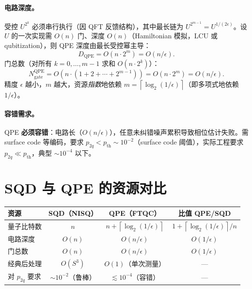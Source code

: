 \documentclass[11pt]{article}
\newcommand{\eps}{\epsilon}
\newcommand{\Oof}[1]{O(#1)}
\newcommand{\ceil}[1]{\left\lceil #1 \right\rceil}
\begin{document}
\paragraph{电路深度。} 受控 $U^{2^k}$ 必须串行执行（因 QFT 反馈结构），其中最长链为 $U^{2^{m-1}}=U^{1/(2\eps)}$。设 $U$ 的一次实现需 $\Oof{n}$ 门、深度 $\Oof{n}$（Hamiltonian 模拟，LCU 或 qubitization），则 QPE 深度由最长受控幂主导：
\begin{equation}\label{eq:qpe-depth}
  \boxed{D_{\mathrm{QPE}} = \Oof{n\cdot 2^m} = \Oof{n/\eps}.}
\end{equation}
门总数（对所有 $k=0,\dots,m-1$ 求和 $\Oof{n\cdot 2^k}$）：
\begin{equation}
  N_{\mathrm{gate}}^{\mathrm{QPE}} = \Oof{n\cdot(1+2+\cdots+2^{m-1})} = \Oof{n\cdot 2^m} = \Oof{n/\eps}.
\end{equation}
精度 $\eps$ 越小，$m$ 越大，资源\emph{指数}地依赖 $m=\ceil{\log_2(1/\eps)}$（即多项式地依赖 $1/\eps$）。

\paragraph{容错需求。} QPE \textbf{必须容错}：电路长（$\Oof{n/\eps}$），任意未纠错噪声累积导致相位估计失败。需 surface code 等编码，要求 $p_{2q}<p_{\mathrm{th}}\sim 10^{-2}$（surface code 阈值），实际工程要求 $p_{2q}\ll p_{\mathrm{th}}$，典型 $\sim 10^{-4}$ 以下。

\section{SQD 与 QPE 的资源对比}
\begin{center}
\begin{tabular}{l|c|c|c}
\hline
资源 & SQD（NISQ） & QPE（FTQC） & 比值 QPE/SQD \\
\hline
量子比特数 & $n$ & $n + \ceil{\log_2(1/\eps)}$ & $1+\ceil{\log_2(1/\eps)}/n$ \\
电路深度 & $\Oof{n}$ & $\Oof{n/\eps}$ & $\Oof{1/\eps}$ \\
门总数 & $\Oof{n}$ & $\Oof{n/\eps}$ & $\Oof{1/\eps}$ \\
经典后处理 & $\Oof{S^3}$ & $\Oof{1}$（单次测量） & — \\
对 $p_{2q}$ 要求 & $\sim 10^{-2}$（鲁棒） & $\lesssim 10^{-4}$（容错） & — \\
\hline
\end{tabular}
\end{center}
\end{document}
